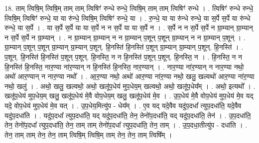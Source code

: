 \documentclass[17pt]{extarticle}
\begin{document}
18. ताम् त्विषि॒म् त्विषि॒म् ताम् ताम् त्विषिꣳ॑ रुन्धे रुन्धे॒ त्विषि॒म् ताम् ताम् त्विषिꣳ॑ रुन्धे । . त्विषिꣳ॑ रुन्धे रुन्धे॒ त्विषि॒म् त्विषिꣳ॑ रुन्धे॒ या या रु॑न्धे॒ त्विषि॒म् त्विषिꣳ॑ रुन्धे॒ या । . रु॒न्धे॒ या या रु॑न्धे रुन्धे॒ या स॒र्पे स॒र्पे या रु॑न्धे रुन्धे॒ या स॒र्पे । . या स॒र्पे स॒र्पे या या स॒र्पे न न स॒र्पे या या स॒र्पे न । . स॒र्पे न न स॒र्पे स॒र्पे न ग्रा॒म्यान् ग्रा॒म्यान् न स॒र्पे स॒र्पे न ग्रा॒म्यान् । . न ग्रा॒म्यान् ग्रा॒म्यान् न न ग्रा॒म्यान् प॒शून् प॒शून् ग्रा॒म्यान् न न ग्रा॒म्यान् प॒शून् । . ग्रा॒म्यान् प॒शून् प॒शून् ग्रा॒म्यान् ग्रा॒म्यान् प॒शून्. हि॒नस्ति॑ हि॒नस्ति॑ प॒शून् ग्रा॒म्यान् ग्रा॒म्यान् प॒शून्. हि॒नस्ति॑ । . प॒शून्. हि॒नस्ति॑ हि॒नस्ति॑ प॒शून् प॒शून्. हि॒नस्ति॒ न न हि॒नस्ति॑ प॒शून् प॒शून्. हि॒नस्ति॒ न । . हि॒नस्ति॒ न न हि॒नस्ति॑ हि॒नस्ति॒ नार॒ण्या ना॑र॒ण्यान् न हि॒नस्ति॑ हि॒नस्ति॒ नार॒ण्यान् । . नार॒ण्या ना॑र॒ण्यान् न नार॒ण्या नथो॒ अथो॑ आर॒ण्यान् न नार॒ण्या नथो᳚ । . आ॒र॒ण्या नथो॒ अथो॑ आर॒ण्या ना॑र॒ण्या नथो॒ खलु॒ खल्वथो॑ आर॒ण्या ना॑र॒ण्या नथो॒ खलु॑ । . अथो॒ खलु॒ खल्वथो॒ अथो॒ खलू॑प॒धेय॑ मुप॒धेय॒म् खल्वथो॒ अथो॒ खलू॑प॒धेय᳚म् । . अथो॒ इत्यथो᳚ । . खलू॑प॒धेय॑ मुप॒धेय॒म् खलु॒ खलू॑प॒धेय॑ मे॒वै वोप॒धेय॒म् खलु॒ खलू॑प॒धेय॑ मे॒व । . उ॒प॒धेय॑ मे॒वै वोप॒धेय॑ मुप॒धेय॑ मे॒व यद् यदे॒ वोप॒धेय॑ मुप॒धेय॑ मे॒व यत् । . उ॒प॒धेय॒मित्यु॑प - धेय᳚म् । . ए॒व यद् यदे॒वैव यदु॑प॒दधा᳚ त्युप॒दधा॑ति॒ यदे॒वैव यदु॑प॒दधा॑ति । . यदु॑प॒दधा᳚ त्युप॒दधा॑ति॒ यद् यदु॑प॒दधा॑ति॒ तेन॒ तेनो॑प॒दधा॑ति॒ यद् यदु॑प॒दधा॑ति॒ तेन॑ । . उ॒प॒दधा॑ति॒ तेन॒ तेनो॑प॒दधा᳚ त्युप॒दधा॑ति॒ तेन॒ ताम् ताम् तेनो॑प॒दधा᳚ त्युप॒दधा॑ति॒ तेन॒ ताम् । . उ॒प॒दधा॒तीत्यु॑प - दधा॑ति । . तेन॒ ताम् ताम् तेन॒ तेन॒ ताम् त्विषि॒म् त्विषि॒म् ताम् तेन॒ तेन॒ ताम् त्विषि᳚म् । \newline
\end{document}
